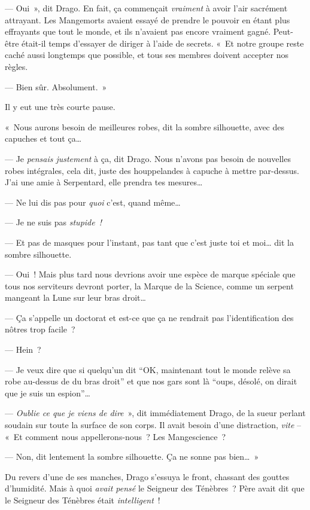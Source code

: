 --- Oui~», dit Drago. En fait, ça commençait \emph{vraiment} à avoir l'air sacrément attrayant. Les Mangemorts avaient essayé de prendre le pouvoir en étant plus effrayants que tout le monde, et ils n'avaient pas encore vraiment gagné. Peut-être était-il temps d'essayer de diriger à l'aide de secrets. «~Et notre groupe reste caché aussi longtemps que possible, et tous ses membres doivent accepter nos règles.

--- Bien sûr. Absolument.~»

Il y eut une très courte pause.

«~Nous aurons besoin de meilleures robes, dit la sombre silhouette, avec des capuches et tout ça…

--- Je \emph{pensais justement} à ça, dit Drago. Nous n'avons pas besoin de nouvelles robes intégrales, cela dit, juste des houppelandes à capuche à mettre par-dessus. J'ai une amie à Serpentard, elle prendra tes mesures…

--- Ne lui dis pas pour \emph{quoi} c'est, quand même…

--- Je ne suis pas \emph{stupide~!}

--- Et pas de masques pour l'instant, pas tant que c'est juste toi et moi… dit la sombre silhouette.

--- Oui~! Mais plus tard nous devrions avoir une espèce de marque spéciale que tous nos serviteurs devront porter, la Marque de la Science, comme un serpent mangeant la Lune sur leur bras droit…

--- Ça s'appelle un doctorat et est-ce que ça ne rendrait pas l'identification des nôtres trop facile~?

--- Hein~?

--- Je veux dire que si quelqu'un dit “OK, maintenant tout le monde relève sa robe au-dessus de du bras droit” et que nos gars sont là “oups, désolé, on dirait que je suis un espion”…

--- \emph{Oublie ce que je viens de dire}~», dit immédiatement Drago, de la sueur perlant soudain sur toute la surface de son corps. Il avait besoin d'une distraction, \emph{vite} -- «~Et comment nous appellerons-nous~? Les Mangescience~?

--- Non, dit lentement la sombre silhouette. Ça ne sonne pas bien…~»

Du revers d'une de ses manches, Drago s'essuya le front, chassant des gouttes d'humidité. Mais à quoi \emph{avait pensé} le Seigneur des Ténèbres~? Père avait dit que le Seigneur des Ténèbres était \emph{intelligent}~!

